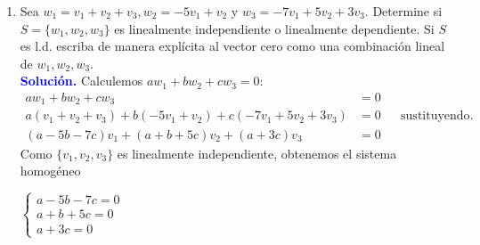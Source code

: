 \documentclass[11pt]{article}
\newcommand{\solution}{\textcolor{blue}{\textbf{Solución. }}}
\begin{document}
\begin{enumerate}
\begin{enumerate}
		\item Sea $w_1=v_1 + v_2 + v_3, w_2=-5v_1 + v_2$ y $w_3=-7v_1 + 5v_2 + 3v_3$. Determine si $S=\{w_1,w_2,w_3\}$ es linealmente independiente o linealmente dependiente. Si $S$ es l.d. escriba de manera explícita al vector cero como una combinación lineal de $w_1,w_2,w_3$. \\
		\solution Calculemos $aw_1 + bw_2 + cw_3 = 0$:
		\begin{align*}
				   aw_1 + bw_2 + cw_3 &= 0 \\
				   a(v_1 + v_2 + v_3) + b(-5v_1 + v_2) + c(-7v_1 + 5v_2 + 3v_3) &= 0 && \text{sustituyendo}.\\
				   (a-5b-7c)v_1 + (a+b+5c)v_2 + (a+3c)v_3  &= 0
		\end{align*} 
		Como $\{v_1,v_2,v_3\}$ es linealmente independiente, obtenemos el sistema homogéneo
		\begin{center} 
		    $\begin{cases}
				  a-5b-7c = 0 \\
				   a+b+5c = 0 \\
				     a+3c = 0
		    \end{cases}$
		\end{center}
		

\end{enumerate}
\end{enumerate}
\end{document}
